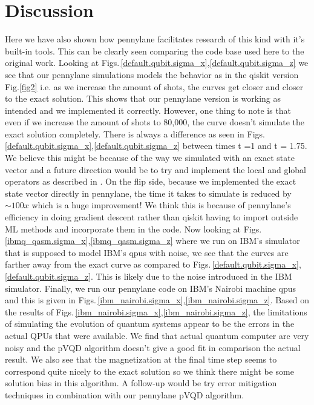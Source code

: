 \documentclass{article}
\begin{document}
\section{Discussion}
Here we have also shown how pennylane facilitates research of this kind with it's built-in tools. This can be clearly seen comparing the code base used here to the original work. Looking at Figs.\,\ref{default.qubit.sigma_x},\ref{default.qubit.sigma_z} we see that our pennylane simulations models the behavior as in the qiskit version Fig.\ref{fig2} i.e. as we increase the amount of shots, the curves get closer and closer to the exact solution. This shows that our pennylane version is working as intended and we implemented it correctly. However, one thing to note is that even if we increase the amount of shots  to 80,000, the curve doesn't simulate the exact solution completely. There is always a difference as seen in Figs.\,\ref{default.qubit.sigma_x},\ref{default.qubit.sigma_z} between times t =1  and t = 1.75. We believe this might be because of the way we simulated with an exact state vector and a future direction would be to try and implement the local and global operators as described in \cite{Barison_2021}. On the flip side, because we implemented the exact state vector directly in pennylane, the time it takes to simulate is reduced by $\sim 100x$ which is a huge improvement! We think this is because of pennylane's efficiency in doing gradient descent rather than qiskit having to import outside ML methods and incorporate them in the code. Now looking at Figs.\,\ref{ibmq_qasm.sigma_x},\ref{ibmq_qasm.sigma_z} where we run on IBM's simulator that is supposed to model IBM's qpus with noise, we see that the curves are farther away from the exact curve as compared to Figs.\,\ref{default.qubit.sigma_x},\ref{default.qubit.sigma_z}. This is likely due to the noise introduced in the IBM simulator. Finally, we run our pennylane code on IBM's Nairobi machine qpus and this is given in Figs.\,\ref{ibm_nairobi.sigma_x},\ref{ibm_nairobi.sigma_z}. Based on the results of Figs.\,\ref{ibm_nairobi.sigma_x},\ref{ibm_nairobi.sigma_z}, the limitations of simulating the evolution of quantum systems appear to be the errors in the actual QPUs that were available. We find that actual quantum computer are very noisy and the pVQD algorithm doesn't give a good fit in comparison the actual result. We also see that the magnetization at the final time step seems to correspond quite nicely to the exact solution so we think there might be some solution bias in this algorithm. A follow-up would be try error mitigation techniques in combination with our pennylane pVQD algorithm.
\end{document}
